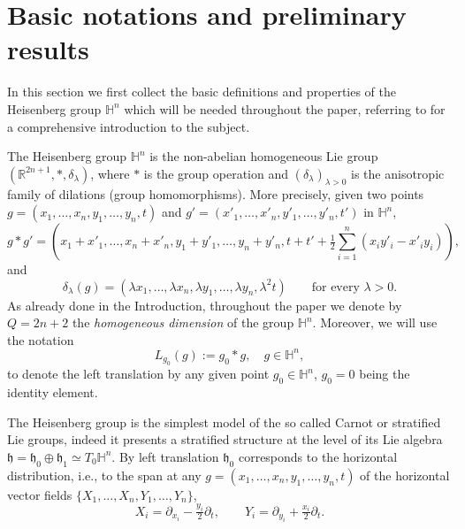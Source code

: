 \documentclass[10pt]{amsart}
\numberwithin{equation}{section}
\theoremstyle{definition}
\newcommand{\R}{{\mathbb R}}
\newcommand{\He}{\mathbb{H}}
\begin{document}





\section{Basic notations and preliminary results}
In this section we first collect the basic definitions and properties
of the Heisenberg group $\mathbb{H}^n$ which will be needed
throughout the paper, referring to \cite{CapognaBook} for a comprehensive introduction to the subject.

The Heisenberg group $\mathbb{H}^n$ is the non-abelian homogeneous Lie group $(\R^{2n+1}, \ast, \delta_{\lambda})$,
where $\ast$ is the group operation and $\left(\delta_{\lambda}\right)_{\lambda>0}$ is the anisotropic family
of dilations (group homomorphisms). More precisely, given two points $g = (x_1, \ldots, x_n, y_1, \ldots, y_n, t)$ 
and $g' = (x'_1,\ldots,x'_n, y'_1,\ldots, y'_n, t')$ in $\mathbb{H}^n$,
$$g \ast g' = \left( x_1 +x'_1, \ldots, x_n+x'_n, y_1 + y'_1, \ldots, y_n+y'_n,  t+ t' + \tfrac{1}{2} \sum_{i=1}^{n}(x_i y'_i - x'_i y_i) \right),$$
\noindent and 
$$\delta_{\lambda}(g) = \left( \lambda x_1, \ldots, \lambda x_n, \lambda y_1, \ldots, \lambda y_n, \lambda^2 t\right) \qquad \textrm{for every } \lambda >0.$$
As already done in the Introduction, throughout the paper we denote by $Q=2n+2$ the {\it homogeneous dimension} of the group $\mathbb{H}^n$.
Moreover, we will use the notation 
$$L_{g_0}(g) := g_0 \ast g, \quad g\in \mathbb{H}^n,$$
\noindent to denote the left translation by any given point $g_0 \in \He^n$, $g_0=0$ being the identity element. 

The Heisenberg group is the simplest model of the so called Carnot or stratified Lie groups, indeed it
presents a stratified structure at the level of its Lie algebra $\mathfrak{h}=\mathfrak{h}_0 \oplus \mathfrak{h}_1 \simeq T_0 \mathbb{H}^n$. By left translation $\mathfrak{h_0}$ corresponds to the horizontal distribution, i.e., to the span at any $g=(x_1, \ldots, x_n,y_1, \ldots, y_n,t)$ of the horizontal vector fields $\{X_1, \ldots, X_n, Y_1, \ldots, Y_n \}$,
\[ X_i=\partial_{x_i} - \tfrac{y_i}{2}\partial_{t}, \qquad Y_i=\partial_{y_i} +\tfrac{x_i}{2}\partial_{t} .\]
\end{document}
